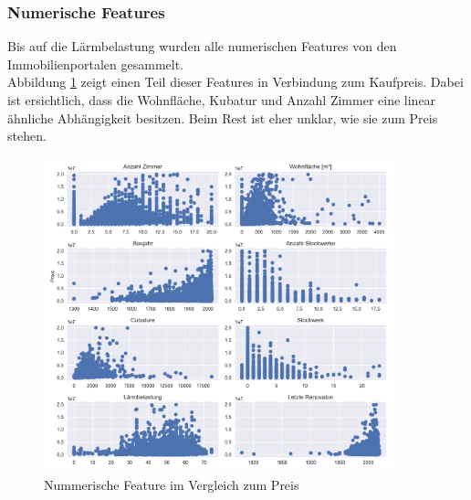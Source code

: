 %
\begin{table}[ht]
\centering
{}
\caption{Statistische Werte des Kaufpreises}
\label{tab:price}
\end{table}
%
\subsubsection{Numerische Features}
Bis auf die Lärmbelastung wurden alle numerischen Features von den Immobilienportalen gesammelt.\\
Abbildung \ref{fig:num_features} zeigt einen Teil dieser Features in Verbindung zum Kaufpreis. Dabei ist ersichtlich, dass die Wohnfläche, Kubatur und Anzahl Zimmer eine linear ähnliche Abhängigkeit besitzen. Beim Rest ist eher unklar, wie sie zum Preis stehen.\\[2ex]
%
\begin{figure}[ht]
\centering
\includegraphics[width=0.9\textwidth]{images/Vergleich_zum_preis.png}
\caption[Nummerische Feature im Vergleich zum Preis]{Nummerische Feature im Vergleich zum Preis}%
\label{fig:num_features}
\end{figure}
